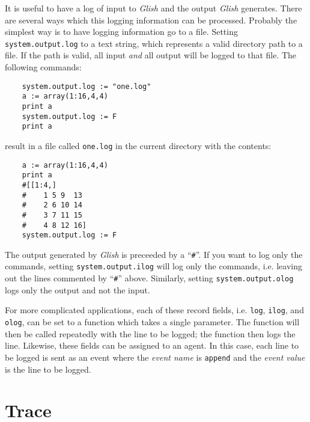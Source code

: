 It is useful to have a log of input to {\em Glish} and the output {\em Glish}
generates. There are several ways which this logging information can
be processed. Probably the simplest way is to have logging information
go to a file. Setting \verb+system.output.log+ to a text string, which
represents a valid directory path to a file. If the path is valid, all
input {\em and} all output will be logged to that file. The following
commands:
\begin{verbatim}
    system.output.log := "one.log"
    a := array(1:16,4,4)
    print a
    system.output.log := F
    print a
\end{verbatim}
result in a file called \verb+one.log+ in the current directory with
the contents:
\begin{verbatim}
    a := array(1:16,4,4)
    print a
    #[[1:4,]
    #    1 5 9  13
    #    2 6 10 14
    #    3 7 11 15
    #    4 8 12 16]
    system.output.log := F
\end{verbatim}
The output generated by {\em Glish} is preceeded by a ``{\tt \#}''. If
you want to log only the commands, setting \verb+system.output.ilog+ will
log only the commands, i.e. leaving out the lines commented by ``{\tt \#}''
above. Similarly, setting \verb+system.output.olog+ logs only the output
and not the input.

For more complicated applications, each of these record fields, i.e. {\tt log},
{\tt ilog}, and {\tt olog}, can be set to a function which takes a single parameter.
The function will then be called repeatedly with the line to be logged; the function
then logs the line. Likewise, these fields can be assigned to an agent. In this case,
each line to be logged is sent as an event where the {\em event name} is {\tt append} and
the {\em event value} is the line to be logged.

\section{Trace}
\label{command-trace}

